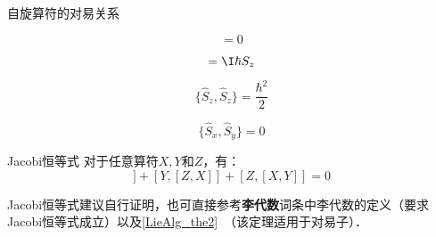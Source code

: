 \begin{theorem}{自旋算符的对易关系}\label{ComOpQ_the8}

\begin{equation}
[\hat{S}_z, \hat{S}_z]=0
\end{equation}

\begin{equation}
[\hat{S}_x, \hat{S}_y]=\I\hbar S_z
\end{equation}

\begin{equation}
\{\hat{S}_z, \hat{S}_z\}=\frac{\hbar^2}{2}
\end{equation}

\begin{equation}
\{\hat{S}_x, \hat{S}_y\}=0
\end{equation}

\end{theorem}






\begin{theorem}{Jacobi恒等式}
对于任意算符$X, Y$和$Z$，有：
\begin{equation}
[X, [Y, Z]]+[Y, [Z, X]]+[Z, [X, Y]]=0
\end{equation}
\end{theorem}

Jacobi恒等式建议自行证明，也可直接参考\textbf{李代数}词条中李代数的定义（要求Jacobi恒等式成立）以及\autoref{LieAlg_the2}~（该定理适用于对易子）．